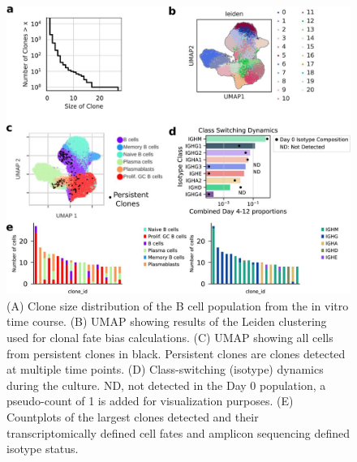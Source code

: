 \begin{figure}[hbt!]
\centering
\includegraphics[width=14cm, keepaspectratio]{figs/paper2/figs3_bcd.jpg}
\caption[Clonal analysis of cell identity outcomes.]{(A) Clone size distribution of the B cell population from the in vitro time course. (B) UMAP showing results of the Leiden clustering used for clonal fate bias calculations. (C) UMAP showing all cells from persistent clones in black. Persistent clones are clones detected at multiple time points. (D) Class-switching (isotype) dynamics during the culture. ND, not detected in the Day 0 population, a pseudo-count of 1 is added for visualization purposes. (E) Countplots of the largest clones detected and their transcriptomically defined cell fates and amplicon sequencing defined isotype status.}
\label{fig:paper2_fig_s3}
\end{figure}

